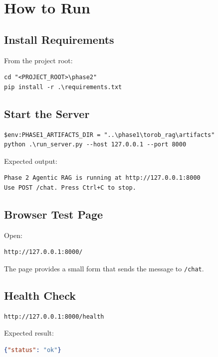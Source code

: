 \documentclass[12pt,a4paper]{article}
\begin{document}
\section{How to Run}

\subsection{Install Requirements}

From the project root:

\begin{lstlisting}
cd "<PROJECT_ROOT>\phase2"
pip install -r .\requirements.txt
\end{lstlisting}

\subsection{Start the Server}

\begin{lstlisting}
$env:PHASE1_ARTIFACTS_DIR = "..\phase1\torob_rag\artifacts"
python .\run_server.py --host 127.0.0.1 --port 8000
\end{lstlisting}

Expected output:

\begin{lstlisting}
Phase 2 Agentic RAG is running at http://127.0.0.1:8000
Use POST /chat. Press Ctrl+C to stop.
\end{lstlisting}

\subsection{Browser Test Page}

Open:

\begin{lstlisting}
http://127.0.0.1:8000/
\end{lstlisting}

The page provides a small form that sends the message to \texttt{/chat}.

\subsection{Health Check}

\begin{lstlisting}
http://127.0.0.1:8000/health
\end{lstlisting}

Expected result:

\begin{lstlisting}[language=json]
{"status": "ok"}
\end{lstlisting}
\end{document}
